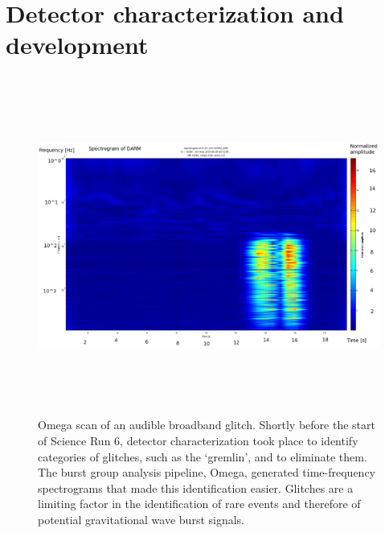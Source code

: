 

\section{Detector characterization and development}
                \label{detchar}
            

\begin{figure}
\begin{center}
\includegraphics[height=111mm, width=148mm]{aglitch928228390_new.eps} 
\caption{Omega scan of an audible broadband glitch. Shortly before the start of Science Run 6, detector characterization took place to identify categories of glitches, such as the `gremlin', and to eliminate them. The burst group analysis pipeline, Omega, generated time-frequency spectrograms that made this identification easier. Glitches are a limiting factor in the identification of rare events and therefore of potential gravitational wave burst signals.}
\label{omega_scan_audible_glitch}
\end{center}
\end{figure}

